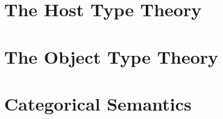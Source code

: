\documentclass[a4paper,UKenglish,cleveref, autoref,numberwithinsect]{lipics-v2019}
\begin{document}
\section{The Host Type Theory}
\label{sec:prelim}



\section{The Object Type Theory}
\label{sec:syntax}



\section{Categorical Semantics}
\label{sec:presheaf_sem}
\end{document}
